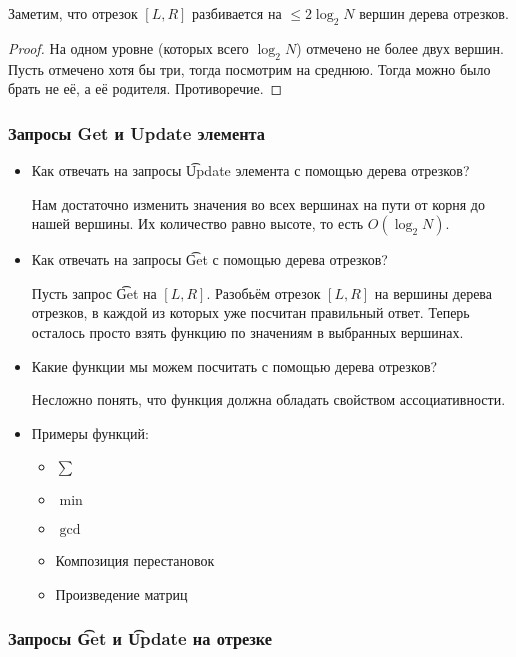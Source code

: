 \begin{lemma}
	Заметим, что отрезок $[L, R]$ разбивается на $\le 2\log_2 N$ вершин дерева отрезков.
\end{lemma}

\begin{proof}
	На одном уровне (которых всего $\log_2 N$) отмечено не более двух вершин.
	Пусть отмечено хотя бы три, тогда посмотрим на среднюю.
	Тогда можно было брать не её, а её родителя.
	Противоречие.
\end{proof}

\subsubsection{Запросы Get и Update элемента}

\begin{itemize}
\item
	Как отвечать на запросы \t{Update} элемента с помощью дерева отрезков?

	Нам достаточно изменить значения во всех вершинах на пути от корня до нашей вершины. Их количество равно высоте, то есть $O(\log_2 N)$.

\item
	Как отвечать на запросы \t{Get} с помощью дерева отрезков?

	Пусть запрос \t{Get} на $[L, R]$.
	Разобьём отрезок $[L, R]$ на вершины дерева отрезков, в каждой из которых уже посчитан правильный ответ.
	Теперь осталось просто взять функцию по значениям в выбранных вершинах.

\item
	Какие функции мы можем посчитать с помощью дерева отрезков?
	
	Несложно понять, что функция должна обладать свойством ассоциативности.

\item
	Примеры функций:
	\begin{itemize}
		\item $\sum$
		\item $\min$
		\item $\gcd$
		\item Композиция перестановок
		\item Произведение матриц
	\end{itemize}
\end{itemize}

\subsubsection{Запросы \t{Get} и \t{Update} на отрезке}

